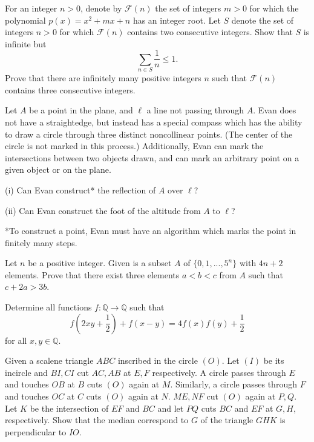 \documentclass[11pt]{scrartcl}
\begin{document}
\begin{problem}[69707766974981]
For an integer $n > 0$, denote by $\mathcal F(n)$ the set of integers $m > 0$ for which the polynomial $p(x) = x^2 + mx + n$ has an integer root.
Let $S$ denote the set of integers $n > 0$ for which $\mathcal F(n)$ contains two consecutive integers. Show that $S$ is infinite but\[ \sum_{n \in S} \frac 1n \le 1. \]
Prove that there are infinitely many positive integers $n$ such that $\mathcal F(n)$ contains three consecutive integers.
\end{problem}
\begin{problem}[70043882336455]
Let $A$ be a point in the plane, and $\ell$ a line not passing through $A$. Evan does not have a straightedge, but instead has a special compass which has the ability to draw a circle through three distinct noncollinear points. (The center of the circle is not marked in this process.) Additionally, Evan can mark the intersections between two objects drawn, and can mark an arbitrary point on a given object or on the plane.

(i) Can Evan construct* the reflection of $A$ over $\ell$?

(ii) Can Evan construct the foot of the altitude from $A$ to $\ell$?

*To construct a point, Evan must have an algorithm which marks the point in finitely many steps.
\end{problem}
\begin{problem}[80567267310692]
Let $n$ be a positive integer. Given is a subset $A$ of $\{0,1,...,5^n\}$ with $4n+2$ elements. Prove that there exist three elements $a<b<c$ from $A$ such that $c+2a>3b$.
\end{problem}
\begin{problem}[85738108708521]
Determine all functions $f: \mathbb{Q} \to \mathbb{Q}$ such that
$$f(2xy + \frac{1}{2}) + f(x-y) = 4f(x)f(y) + \frac{1}{2}$$for all $x,y \in \mathbb{Q}$.
\end{problem}
\begin{problem}[86986480818494]
Given a scalene triangle $ABC$ inscribed in the circle $(O)$. Let $(I)$ be its incircle and $BI,CI$ cut $AC,AB$ at $E,F$ respectively. A circle passes through $E$ and touches $OB$ at $B$ cuts $(O)$ again at $M$. Similarly, a circle passes through $F$ and touches $OC$ at $C$ cuts $(O)$ again at $N$. $ME,NF$ cut $(O)$ again at $P,Q$. Let $K$ be the intersection of $EF$ and $BC$ and let $PQ$ cuts $BC$ and $EF$ at $G,H$, respectively. Show that the median correspond to $G$ of the triangle $GHK$ is perpendicular to $IO$.
\end{problem}
\end{document}
